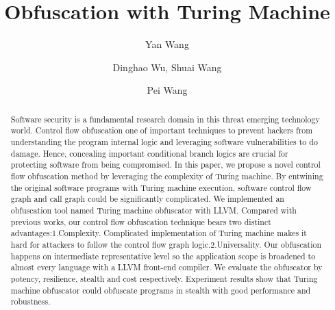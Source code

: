 \documentclass[lnicst]{svmultln}
\begin{document}
%
\mainmatter              %
%
\title{Obfuscation with Turing Machine}
%
%
\author{Yan Wang \and Dinghao Wu,
Shuai Wang \and Pei Wang}
%
%
%
\institute{Pennsylvania State University, State College,PA 16801, USA,\\
\email{ybw5084@ist.psu.edu} %
}
\maketitle              

\begin{abstract}        %
Software security is a fundamental research domain in this threat emerging technology world. Control flow obfuscation one of important techniques to prevent hackers from understanding the program internal logic and leveraging software vulnerabilities to do damage. Hence, concealing important conditional branch logics are crucial for protecting software from being compromised. In this paper, we propose a novel control flow obfuscation method by leveraging the complexity of Turing machine. By entwining the original software programs with Turing machine execution, software control flow graph and call graph could be significantly complicated. We implemented an obfuscation tool named Turing machine obfuscator with LLVM. Compared with previous works, our control flow obfuscation technique bears two distinct advantages:1.Complexity. Complicated implementation of Turing machine makes it hard for attackers to follow the control flow graph logic.2.Universality. Our obfuscation happens on intermediate representative level so the application scope is broadened to almost every language with a LLVM front-end compiler.  We evaluate the obfuscator by potency, resilience, stealth and cost respectively. Experiment results show that Turing machine obfuscator could obfuscate programs in stealth with good performance and robustness. 
\end{abstract}
%
\end{document}
